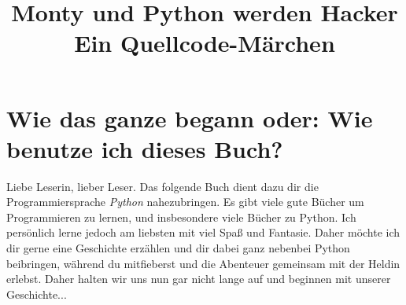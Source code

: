 \documentclass[a5paper,12pt,twoside,openright]{scrbook}
\title{Monty und Python werden Hacker \newline \small Ein Quellcode-Märchen}
\begin{document}
\maketitle
 
\tableofcontents 
 
\chapter{Wie das ganze begann oder: Wie benutze ich dieses Buch?} 

Liebe Leserin, lieber Leser.
Das folgende Buch dient dazu dir die Programmiersprache \emph{Python} nahezubringen.
Es gibt viele gute Bücher um Programmieren zu lernen, 
und insbesondere viele Bücher zu Python.
Ich persönlich lerne jedoch am liebsten mit viel Spa{\ss} und Fantasie.
Daher möchte ich dir gerne eine Geschichte erzählen und dir dabei ganz nebenbei 
Python beibringen, während du mitfieberst und die Abenteuer gemeinsam mit der Heldin erlebst.
Daher halten wir uns nun gar nicht lange auf und beginnen mit unserer Geschichte...
\end{document}
